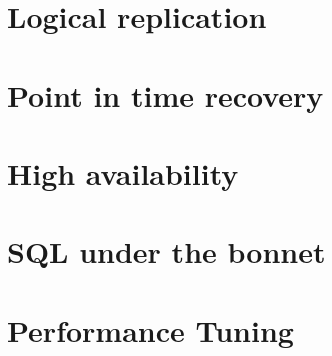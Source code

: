 \documentclass[oneside]{book}
\begin{document}
\tableofcontents{}






\chapter{Logical replication}
\chapter{Point in time recovery}
\chapter{High availability}
\chapter{SQL under the bonnet}
\chapter{Performance Tuning}

\appendix

\listoffigures
\listoftables
\printindex{}
\end{document}
